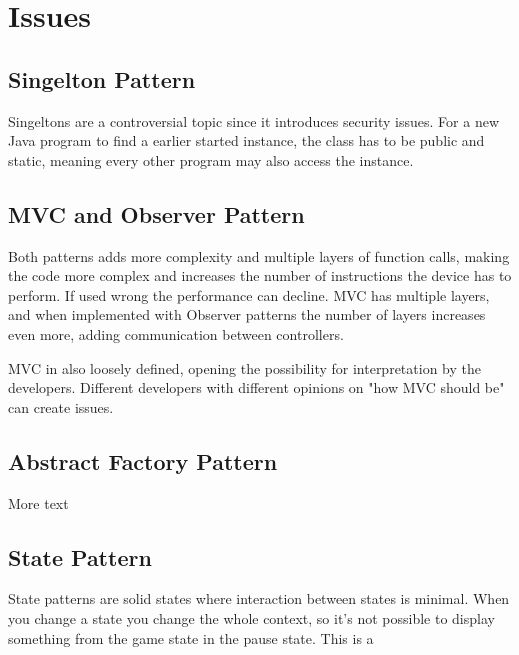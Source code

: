\chapter{Issues}
\section{Singelton Pattern}
	Singeltons are a controversial topic since it introduces security issues. For a new Java program to find a earlier started instance, the class has to be public and static, meaning every other program may also access the instance. 

\section{MVC and Observer Pattern}
	Both patterns adds more complexity and multiple layers of function calls, making the code more complex and increases the number of instructions the device has to perform. If used wrong the performance can decline. MVC has multiple layers, and when implemented with Observer patterns the number of layers increases even more, adding communication between controllers.

	MVC in also loosely defined, opening the possibility for interpretation by the developers. Different developers with different opinions on "how MVC should be" can create issues.

\section{Abstract Factory Pattern}
	More text %

\section{State Pattern}
	State patterns are solid states where interaction between states is minimal. When you change a state you change the whole context, so it's not possible to display something from the game state in the pause state. This is a 